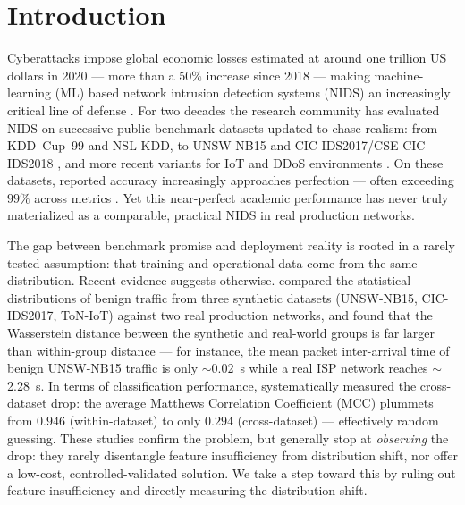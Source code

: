 \documentclass[preprint,12pt,authoryear]{elsarticle}
\begin{document}
\section{Introduction}
\label{sec:intro}

Cyberattacks impose global economic losses estimated at around one trillion US
dollars in 2020 --- more than a $50\%$ increase since 2018
\citep{cremer} --- making machine-learning (ML) based network intrusion detection
systems (NIDS) an increasingly critical line of defense
\citep{torres,sarker,khraisat,buczak,bhuyan}. For two decades the research
community has evaluated NIDS on successive public benchmark datasets updated to
chase realism: from KDD~Cup~99 \citep{kdd} and NSL-KDD, to UNSW-NB15
\citep{unsw,unsweval} and CIC-IDS2017/CSE-CIC-IDS2018 \citep{cicids}, and more
recent variants for IoT and DDoS environments
\citep{botiot,toniot,ciciot,cicddos,ring}. On these datasets, reported accuracy
increasingly approaches perfection --- often exceeding $99\%$ across metrics
\citep{layeghy}. Yet this near-perfect academic performance has never truly
materialized as a comparable, practical NIDS in real production networks.

The gap between benchmark promise and deployment reality is rooted in a rarely
tested assumption: that training and operational data come from the same
distribution. Recent evidence suggests otherwise. \citet{layeghy} compared the
statistical distributions of benign traffic from three synthetic datasets
(UNSW-NB15, CIC-IDS2017, ToN-IoT) against two real production networks, and found
that the Wasserstein distance \citep{wasserstein} between the synthetic and
real-world groups is far larger than within-group distance --- for instance, the
mean packet inter-arrival time of benign UNSW-NB15 traffic is only
$\sim$\SI{0.02}{\second} while a real ISP network reaches
$\sim$\SI{2.28}{\second}. In terms of classification performance, \citet{cantone}
systematically measured the cross-dataset drop: the average Matthews Correlation
Coefficient (MCC) plummets from $0.946$ (within-dataset) to only $0.294$
(cross-dataset) --- effectively random guessing. These studies
\citep{cantone,layeghy,dhooge,verkerken} confirm the problem, but generally stop
at \emph{observing} the drop: they rarely disentangle feature insufficiency from
distribution shift, nor offer a low-cost, controlled-validated solution. We take a
step toward this by ruling out feature insufficiency and directly measuring the
distribution shift.
\end{document}

